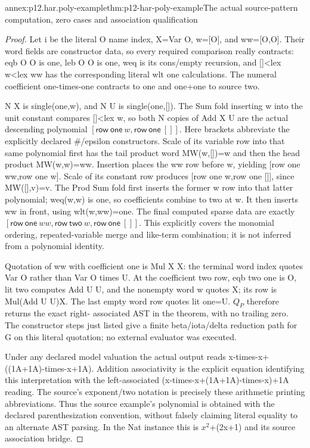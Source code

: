 \begin{annexitem}{annex:p12.har.poly-example}{thm:p12-har-poly-example}{The actual source-pattern computation, zero cases and association qualification}
\begin{proof}
Let i be the literal O name index, X=Var O, w=[O], and ww=[O,O].
Their word fields are constructor data, so every required comparison
really contracts: eqb O O is one, leb O O is one, weq is its
cons/empty recursion, and []<lex w<lex ww has the corresponding
literal wlt one calculations. The numeral coefficient one-times-one
contracts to one and one+one to source two.

N X is single(one,w), and N U is single(one,[]). The Sum fold
inserting w into the unit constant compares []<lex w, so both N
copies of Add X U are the actual descending polynomial
\([\mathsf{row}\ \mathsf{one}\ w,
\mathsf{row}\ \mathsf{one}\ []]\).
Here brackets abbreviate the explicitly declared \#/epsilon constructors.
Scale of its variable row into that same polynomial first has the
tail product word MW(w,[])=w and then the head product MW(w,w)=ww.
Insertion places the ww row before w, yielding [row one ww,row one w].
Scale of its constant row produces [row one w,row one []], since
MW([],v)=v. The Prod Sum fold first inserts the former w row into
that latter polynomial; weq(w,w) is one, so coefficients combine
to two at w. It then inserts ww in front, using wlt(w,ww)=one.
The final computed sparse data are exactly
\([\mathsf{row}\ \mathsf{one}\ ww,
\mathsf{row}\ \mathsf{two}\ w,
\mathsf{row}\ \mathsf{one}\ []]\).
This explicitly covers the monomial ordering, repeated-variable merge
and like-term combination; it is not inferred from a polynomial identity.

Quotation of ww with coefficient one is Mul X X: the terminal
word index quotes Var O rather than Var O times U. At the coefficient
two row, eqb two one is O, lit two computes Add U U, and the
nonempty word w quotes X; its row is Mul(Add U U)X. The last empty
word row quotes lit one=U. \(Q_P\) therefore returns the exact right-
associated AST in the theorem, with no trailing zero. The constructor
steps just listed give a finite beta/iota/delta reduction path for G
on this literal quotation; no external evaluator was executed.

Under any declared model valuation the actual output reads
x-times-x+((1A+1A)-times-x+1A). Addition associativity is the explicit
equation identifying this interpretation with the left-associated
(x-times-x+(1A+1A)-times-x)+1A reading. The source's exponent/two
notation is precisely these arithmetic printing abbreviations. Thus
the source example's polynomial is obtained with the declared
parenthesization convention, without falsely claiming literal equality
to an alternate AST parsing. In the Nat instance this is \(x^2\)+(2x+1)
and its source association bridge.


\end{proof}
\end{annexitem}
